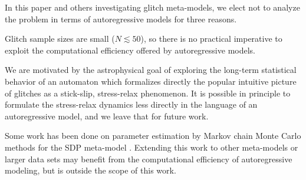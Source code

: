 \begin{subappendices}
In this paper and others investigating glitch meta-models, we elect not to analyze the problem in terms of autoregressive models for three reasons. \begin{enumerate*} \item Glitch sample sizes are small ($N \lesssim 50$), so there is no practical imperative to exploit the computational efficiency offered by autoregressive models. 
\item We are motivated by the astrophysical goal of exploring the long-term statistical behavior of an automaton which formalizes directly the popular intuitive picture of glitches as a stick-slip, stress-relax phenomenon. It is possible in principle to formulate the stress-relax dynamics less directly in the language of an autoregressive model, and we leave that for future work.
\item Some work has been done on parameter estimation by Markov chain Monte Carlo methods for the SDP meta-model \citep{Melatos2019}. Extending this work to other meta-models or larger data sets may benefit from the computational efficiency of autoregressive modeling, but is outside the scope of this work. 
\end{enumerate*}

\end{subappendices}